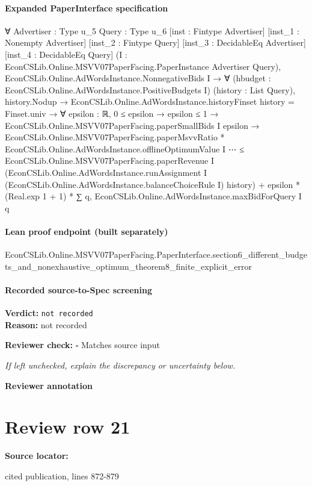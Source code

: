 \documentclass[10pt]{article}
\newcommand{\reviewerbox}{%
  \par\noindent\fbox{\parbox{0.96\linewidth}{\rule{0pt}{0.38in}}}\par
}
\newcommand{\reviewmatch}[1]{%
  \par\noindent\textbf{Reviewer check:} $\square$\; #1\par
  \noindent\emph{If left unchecked, explain the discrepancy or uncertainty below.}\par
}
\begin{document}
\paragraph{Expanded PaperInterface specification}
\begin{ReviewVerbatim}
∀ {Advertiser : Type u_5} {Query : Type u_6} [inst : Fintype Advertiser] [inst_1 : Nonempty Advertiser]
  [inst_2 : Fintype Query] [inst_3 : DecidableEq Advertiser] [inst_4 : DecidableEq Query]
  (I : EconCSLib.Online.MSVV07PaperFacing.PaperInstance Advertiser Query),
  EconCSLib.Online.AdWordsInstance.NonnegativeBids I →
    ∀ (hbudget : EconCSLib.Online.AdWordsInstance.PositiveBudgets I) (history : List Query),
      history.Nodup →
        EconCSLib.Online.AdWordsInstance.historyFinset history = Finset.univ →
          ∀ {epsilon : ℝ},
            0 ≤ epsilon →
              epsilon ≤ 1 →
                EconCSLib.Online.MSVV07PaperFacing.paperSmallBids I epsilon →
                  EconCSLib.Online.MSVV07PaperFacing.paperMsvvRatio *
                      EconCSLib.Online.AdWordsInstance.offlineOptimumValue I ⋯ ≤
                    EconCSLib.Online.MSVV07PaperFacing.paperRevenue I
                        (EconCSLib.Online.AdWordsInstance.runAssignment I
                          (EconCSLib.Online.AdWordsInstance.balanceChoiceRule I) history) +
                      epsilon * (Real.exp 1 + 1) * ∑ q, EconCSLib.Online.AdWordsInstance.maxBidForQuery I q
\end{ReviewVerbatim}

\paragraph{Lean proof endpoint (built separately)}\begin{ReviewVerbatim}
EconCSLib.Online.MSVV07PaperFacing.PaperInterface.section6_different_budgets_and_nonexhaustive_optimum_theorem8_finite_explicit_error
\end{ReviewVerbatim}

\paragraph{Recorded source-to-Spec screening}
\textbf{Verdict:} \texttt{not recorded}
\\
\textbf{Reason:} not recorded
\reviewmatch{Matches source input}
\noindent\textbf{Reviewer annotation}\par
\reviewerbox
\clearpage
\hypertarget{source-claim-f235ff3a2d4fdaaf}{}
\section*{Review row 21}
\textbf{Source locator:} {\footnotesize\raggedright cited publication, lines 872-\allowbreak{}879\par}
\end{document}

